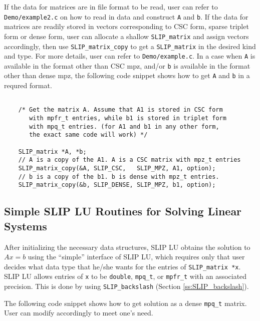 \documentclass[12pt]{article}
\theoremstyle{definition}
\begin{document}
If the data for matrices are in file format to be read, user can refer to
\verb|Demo/example2.c| on how to read in data and construct \verb|A| and
\verb|b|. If the data for matrices are readily stored in vectors corresponding
to CSC form, sparse triplet form or dense form, user can allocate a shallow
\verb|SLIP_matrix| and assign vectors accordingly, then use
\verb|SLIP_matrix_copy| to get a \verb|SLIP_matrix| in the desired kind and
type. For more details, user can refer to \verb|Demo/example.c|. In a case
when \verb|A| is available in the format other than CSC mpz, and/or \verb|b|
is available in the format other than dense mpz, the following code snippet
shows how to get \verb|A| and \verb|b| in a requred format.

{\small
\begin{verbatim}

    /* Get the matrix A. Assume that A1 is stored in CSC form
       with mpfr_t entries, while b1 is stored in triplet form
       with mpq_t entries. (for A1 and b1 in any other form,
       the exact same code will work) */

    SLIP_matrix *A, *b;
    // A is a copy of the A1. A is a CSC matrix with mpz_t entries
    SLIP_matrix_copy(&A, SLIP_CSC,   SLIP_MPZ, A1, option);
    // b is a copy of the b1. b is dense with mpz_t entries. 
    SLIP_matrix_copy(&b, SLIP_DENSE, SLIP_MPZ, b1, option);
    \end{verbatim} }

\cprotect\subsection{Simple SLIP LU Routines for Solving Linear Systems}
\label{s:Using:simple}

After initializing the necessary data structures, SLIP LU obtains the solution
to $A x = b$ using the ``simple'' interface of SLIP LU, which requires only that
user decides what data type that he/she wants for the entries of
\verb|SLIP_matrix *x|. SLIP LU allows entries of \verb|x| to be \verb|double|,
\verb|mpq_t|, or \verb|mpfr_t| with an associated precision.
This is done by using \verb|SLIP_backslash| (Section \ref{ss:SLIP_backslash}).

The following code snippet shows how to get solution as a dense \verb|mpq_t|
matrix. User can modify accordingly to meet one's need.
\end{document}
